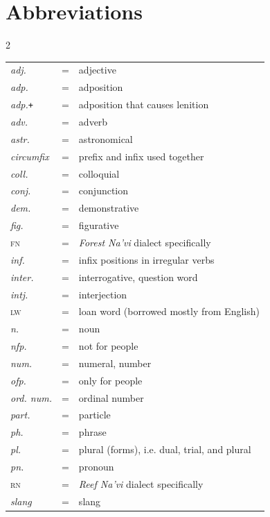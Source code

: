 \newpage
{}
\section*{Abbreviations}

\begin{multicols}{2}
\begin{footnotesize}
\begin{tabular}{ l c l }
  \emph{adj.} & = & adjective \\
  \emph{adp.} & = & adposition \\
  \emph{adp.}\texttt{+} & = & adposition that causes lenition \\
  \emph{adv.} & = & adverb \\
  \emph{astr.} & = & astronomical \\
  \emph{circumfix} & = & prefix and infix used together \\
  \emph{coll.} & = & colloquial \\
  \emph{conj.} & = &  conjunction\\
  \emph{dem.} & = & demonstrative \\
  \emph{fig.} & = & figurative \\
  \textsc{fn} & = & \emph{Forest Na'vi} dialect specifically \\
  \emph{inf.} & = &  infix positions in irregular verbs\\
  \emph{inter.} & = & interrogative, question word \\
  \emph{intj.} & = & interjection \\
  \textsc{lw} & = & loan word (borrowed mostly from English) \\
  \emph{n.} & = & noun \\
  \emph{nfp.} & = & not for people \\
  \emph{num.} & = & numeral, number \\
  \emph{ofp.} & = & only for people \\
  \emph{ord. num.} & = & ordinal number \\
  \emph{part.} & = &  particle \\
  \emph{ph.} & = & phrase \\
  \emph{pl.} & = & plural (forms), i.e. dual, trial, and plural \\
  \emph{pn.} & = & pronoun \\
  \textsc{rn} & = & \emph{Reef Na'vi} dialect specifically \\
  \emph{slang} & = & slang \\

\end{tabular}
\end{footnotesize}
\end{multicols}
